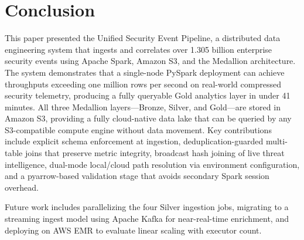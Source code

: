 \documentclass[conference]{IEEEtran}
\begin{document}
\section{Conclusion}
\label{sec:conclusion}

This paper presented the Unified Security Event Pipeline, a distributed data engineering system that ingests and correlates over 1.305 billion enterprise security events using Apache Spark, Amazon S3, and the Medallion architecture. The system demonstrates that a single-node PySpark deployment can achieve throughputs exceeding one million rows per second on real-world compressed security telemetry, producing a fully queryable Gold analytics layer in under 41 minutes. All three Medallion layers---Bronze, Silver, and Gold---are stored in Amazon S3, providing a fully cloud-native data lake that can be queried by any S3-compatible compute engine without data movement. Key contributions include explicit schema enforcement at ingestion, deduplication-guarded multi-table joins that preserve metric integrity, broadcast hash joining of live threat intelligence, dual-mode local/cloud path resolution via environment configuration, and a pyarrow-based validation stage that avoids secondary Spark session overhead.

Future work includes parallelizing the four Silver ingestion jobs, migrating to a streaming ingest model using Apache Kafka for near-real-time enrichment, and deploying on AWS EMR to evaluate linear scaling with executor count.

\balance
\end{document}
